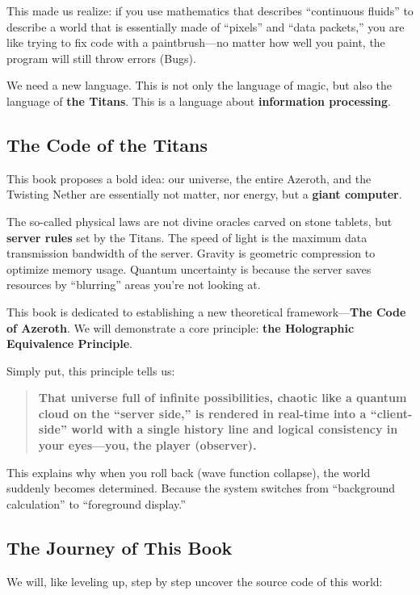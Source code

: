 This made us realize: if you use mathematics that describes ``continuous fluids'' to describe a world that is essentially made of ``pixels'' and ``data packets,'' you are like trying to fix code with a paintbrush---no matter how well you paint, the program will still throw errors (Bugs).

We need a new language. This is not only the language of magic, but also the language of \textbf{the Titans}. This is a language about \textbf{information processing}.

\subsection*{The Code of the Titans}

This book proposes a bold idea: our universe, the entire Azeroth, and the Twisting Nether are essentially not matter, nor energy, but a \textbf{giant computer}.

The so-called physical laws are not divine oracles carved on stone tablets, but \textbf{server rules} set by the Titans.
The speed of light is the maximum data transmission bandwidth of the server.
Gravity is geometric compression to optimize memory usage.
Quantum uncertainty is because the server saves resources by ``blurring'' areas you're not looking at.

This book is dedicated to establishing a new theoretical framework---\textbf{The Code of Azeroth}. We will demonstrate a core principle: \textbf{the Holographic Equivalence Principle}.

Simply put, this principle tells us:
\begin{quote}
\textbf{That universe full of infinite possibilities, chaotic like a quantum cloud on the ``server side,'' is rendered in real-time into a ``client-side'' world with a single history line and logical consistency in your eyes---you, the player (observer).}
\end{quote}

This explains why when you roll back (wave function collapse), the world suddenly becomes determined. Because the system switches from ``background calculation'' to ``foreground display.''

\subsection*{The Journey of This Book}

We will, like leveling up, step by step uncover the source code of this world:

